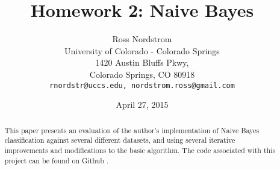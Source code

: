 \documentclass{sig-alternate}
\begin{document}
\title{Homework 2: Naive Bayes}
\author{Ross Nordstrom\\
        University of Colorado - Colorado Springs\\
        1420 Austin Bluffs Pkwy,\\
        Colorado Springs, CO 80918\\
        \texttt{rnordstr@uccs.edu, nordstrom.ross@gmail.com}
       }
\date{April 27, 2015}

\maketitle

\begin{abstract}
   This paper presents an evaluation of the author's implementation of Naive Bayes classification against
   several different datasets, and using several iterative improvements and modifications to the basic algorithm.
   The code associated with this project can be found on Github \cite{repo}.
\end{abstract}






{}

\end{document}
